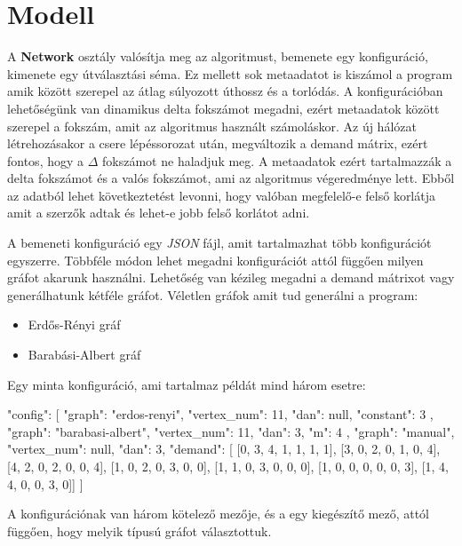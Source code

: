 \documentclass[12pt]{report}
\begin{document}
\section{Modell}

A \textbf{Network} osztály valósítja meg az algoritmust, bemenete egy konfiguráció, kimenete egy útválasztási séma.
Ez mellett sok metaadatot is kiszámol a program amik között szerepel az átlag súlyozott úthossz és a torlódás.
A konfigurációban lehetőségünk van dinamikus delta fokszámot megadni, ezért metaadatok között szerepel a fokszám, amit az algoritmus használt számoláskor.
Az új hálózat létrehozásakor a csere lépéssorozat után, megváltozik a demand mátrix, ezért fontos, hogy a \(\Delta\) fokszámot ne haladjuk meg.
A metaadatok ezért tartalmazzák a delta fokszámot és a valós fokszámot, ami az algoritmus végeredménye lett.  
Ebből az adatból lehet következtetést levonni, hogy valóban megfelelő-e felső korlátja amit a szerzők adtak és lehet-e jobb felső korlátot adni. 

A bemeneti konfiguráció egy \textit{JSON} fájl, amit tartalmazhat több konfigurációt egyszerre.
Többféle módon lehet megadni konfigurációt attól függően milyen gráfot akarunk használni. 
Lehetőség van kézileg megadni a demand mátrixot vagy generálhatunk kétféle gráfot.
Véletlen gráfok amit tud generálni a program:
\begin{itemize}
	\item Erdős-Rényi gráf
	\item Barabási-Albert gráf
\end{itemize}

Egy minta konfiguráció, ami tartalmaz példát mind három esetre:

\begin{mintedJson}
{
  "config": [ {
	"graph": "erdos-renyi",
	"vertex_num": 11,
	"dan": null,
	"constant": 3
  }, {
	"graph": "barabasi-albert",
	"vertex_num": 11,
	"dan": 3,
	"m": 4
  }, {
	"graph": "manual",
	"vertex_num": null,
	"dan": 3,
	"demand": [
		[0, 3, 4, 1, 1, 1, 1],
		[3, 0, 2, 0, 1, 0, 4],
		[4, 2, 0, 2, 0, 0, 4],
		[1, 0, 2, 0, 3, 0, 0],
		[1, 1, 0, 3, 0, 0, 0],
		[1, 0, 0, 0, 0, 0, 3],
		[1, 4, 4, 0, 0, 3, 0]]	
	} ]
}
\end{mintedJson}

A konfigurációnak van három kötelező mezője, és a egy kiegészítő mező, attól függően, hogy melyik típusú gráfot választottuk. 
\end{document}

